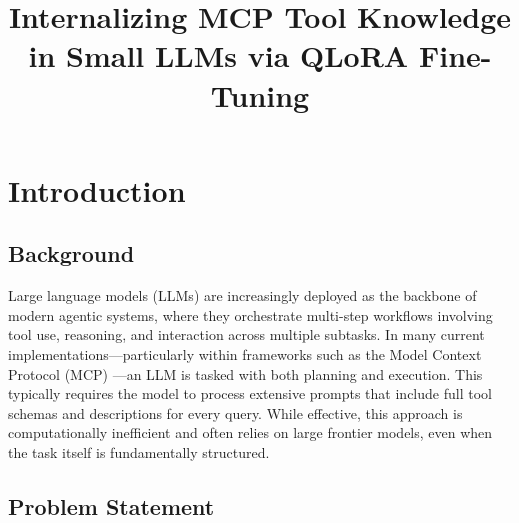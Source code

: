\documentclass[conference]{IEEEtran}
\begin{document}
\title{Internalizing MCP Tool Knowledge in Small LLMs via QLoRA Fine-Tuning}
\author{
\and
{}
\and
{}
}
\maketitle

\section{Introduction}

\subsection{Background}

Large language models (LLMs) are increasingly deployed as the backbone of modern agentic systems, where they orchestrate multi-step workflows involving tool use, reasoning, and interaction across multiple subtasks. In many current implementations---particularly within frameworks such as the Model Context Protocol (MCP) \cite{b1}---an LLM is tasked with both planning and execution. This typically requires the model to process extensive prompts that include full tool schemas and descriptions for every query. While effective, this approach is computationally inefficient and often relies on large frontier models, even when the task itself is fundamentally structured.

\subsection{Problem Statement}
\end{document}
